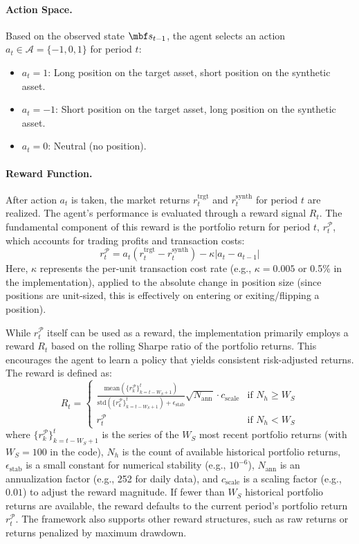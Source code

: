 \documentclass[12pt,a4paper]{article}
\begin{document}
\paragraph{Action Space.}
Based on the observed state $\mbf s_{t-1}$, the agent selects an action $a_{t} \in \mathcal{A} = \{-1, 0, 1\}$ for period $t$:
\begin{itemize}
    \item $a_{t}=1$: Long position on the target asset, short position on the synthetic asset.
    \item $a_{t}=-1$: Short position on the target asset, long position on the synthetic asset.
    \item $a_{t}=0$: Neutral (no position).
\end{itemize}

\paragraph{Reward Function.}
After action $a_t$ is taken, the market returns $r_t^{\text{trgt}}$ and $r_t^{\text{synth}}$ for period $t$ are realized. The agent's performance is evaluated through a reward signal $R_t$. The fundamental component of this reward is the portfolio return for period $t$, $r_{t}^{\mathcal P}$, which accounts for trading profits and transaction costs:
%
\[
r_{t}^{\mathcal P} = a_t (r_t^{\text{trgt}} - r_t^{\text{synth}}) - \kappa |a_{t}-a_{t-1}|
\]
%
Here, $\kappa$ represents the per-unit transaction cost rate (e.g., $\kappa = 0.005$ or 0.5\% in the implementation), applied to the absolute change in position size (since positions are unit-sized, this is effectively on entering or exiting/flipping a position).

While $r_{t}^{\mathcal P}$ itself can be used as a reward, the implementation primarily employs a reward $R_t$ based on the rolling Sharpe ratio of the portfolio returns. This encourages the agent to learn a policy that yields consistent risk-adjusted returns. The reward is defined as:
\[
R_t =
\begin{cases}
\frac{\text{mean}(\{r_{k}^{\mathcal P}\}_{k=t-W_S+1}^{t})}{\text{std}(\{r_{k}^{\mathcal P}\}_{k=t-W_S+1}^{t}) + \epsilon_{\text{stab}}} \sqrt{N_{\text{ann}}} \cdot c_{\text{scale}} & \text{if } N_h \ge W_S \\
r_{t}^{\mathcal P} & \text{if } N_h < W_S
\end{cases}
\]
where $\{r_{k}^{\mathcal P}\}_{k=t-W_S+1}^{t}$ is the series of the $W_S$ most recent portfolio returns (with $W_S=100$ in the code), $N_h$ is the count of available historical portfolio returns, $\epsilon_{\text{stab}}$ is a small constant for numerical stability (e.g., $10^{-6}$), $N_{\text{ann}}$ is an annualization factor (e.g., 252 for daily data), and $c_{\text{scale}}$ is a scaling factor (e.g., $0.01$) to adjust the reward magnitude. If fewer than $W_S$ historical portfolio returns are available, the reward defaults to the current period's portfolio return $r_{t}^{\mathcal P}$. The framework also supports other reward structures, such as raw returns or returns penalized by maximum drawdown.
\end{document}
